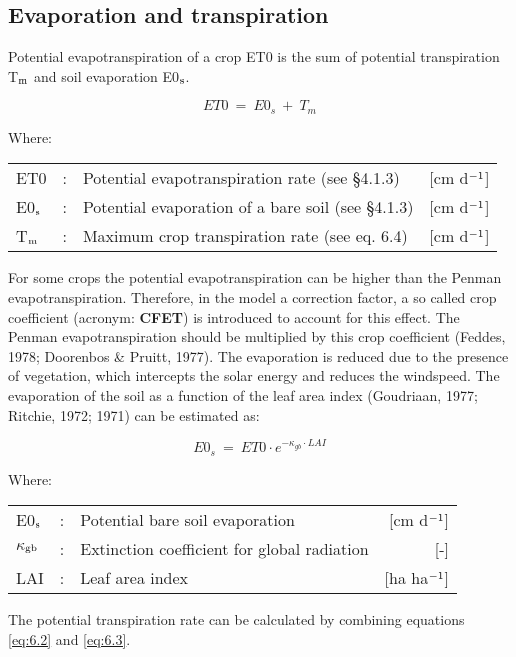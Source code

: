 \subsection{Evaporation and transpiration}
Potential evapotranspiration of a crop ET0 is the sum of potential transpiration T$_{{\rm m}}$ and
soil evaporation E0$_{{\rm s}}$.

\begin{equation}
\label{eq:6.2}
ET0 ~=~ E0_{s} ~+~ T_{m} 
\end{equation}
 
Where:\\[5pt]
\begin{tabularx}{\textwidth}{llXr}
ET0 &:& Potential evapotranspiration rate (see \S 4.1.3) & [cm d$^{{\rm -1}}$]\\
E0$_{{\rm s}}$ &:& Potential evaporation of a bare soil (see \S 4.1.3)  & [cm d$^{{\rm -1}}$]\\
T$_{{\rm m}}$ &:& Maximum crop transpiration rate (see eq. 6.4)  & [cm d$^{{\rm -1}}$]\\
\end{tabularx}

For some crops the potential evapotranspiration can be higher than the Penman evapotranspiration. 
Therefore, in the model a correction factor, a so called  crop coefficient
(acronym: {\bf CFET}) is introduced to account for this effect. The Penman evapotranspiration
should be multiplied by this crop coefficient (Feddes, 1978; Doorenbos \& Pruitt, 1977).
The evaporation is reduced due to the presence of vegetation, which intercepts the solar
energy and reduces the windspeed. The evaporation of the soil as a function of the leaf
area index (Goudriaan, 1977; Ritchie, 1972; 1971) can be estimated as:

\begin{equation}
\label{eq:6.3}
E0 _{s} ~=~ ET0 \cdot e^{-\kappa_{gb} \cdot LAI}
\end{equation}

Where:\\[5pt]
\begin{tabularx}{\textwidth}{llXr}
E0$_{{\rm s}}$ &:& Potential bare soil evaporation  & [cm d$^{{\rm -1}}$]\\
 $\kappa$$_{{\rm gb}}$ &:& Extinction coefficient for global radiation  & [-]\\
 LAI &:& Leaf area index  & [ha ha$^{{\rm -1}}$]\\
\end{tabularx}
 
The potential transpiration rate can be calculated by combining equations \ref{eq:6.2} and 
\ref{eq:6.3}.

